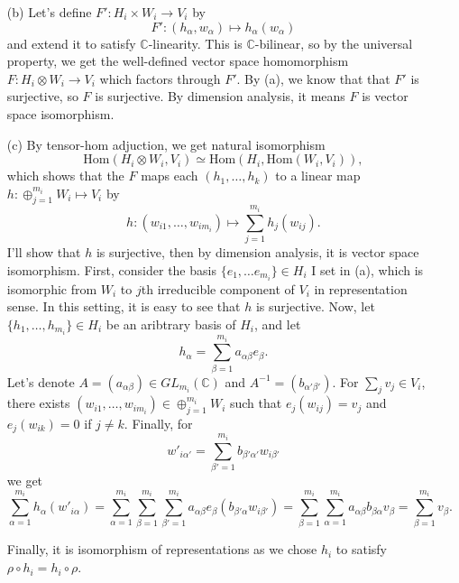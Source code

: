 \documentclass[a4paper, 12pt]{article}
\theoremstyle{Mydefinition}
\theoremstyle{Mytheorem}
\begin{document}
\begin{enumerate}
    \item[(b)] Let's define $F':H_i\times W_i\rightarrow V_i$ by
    \begin{equation}
        F':(h_\alpha, w_\alpha)\mapsto h_\alpha(w_\alpha)
    \end{equation}
    and extend it to satisfy $\mathbb{C}$-linearity. This is $\mathbb{C}$-bilinear, so by the universal property, we get the well-defined vector space homomorphism $F:H_i\otimes W_i\rightarrow V_i$ which factors through $F'$. By (a), we know that that $F'$ is surjective, so $F$ is surjective. By dimension analysis, it means $F$ is vector space isomorphism.
    
    \item[(c)] By tensor-hom adjuction, we get natural isomorphism
    \begin{equation}
        \mathrm{Hom}(H_i\otimes W_i, V_i)\simeq \mathrm{Hom}(H_i, \mathrm{Hom}(W_i, V_i)),
    \end{equation}
    which shows that the $F$ maps each $(h_1, \ldots, h_k)$ to a linear map $h:\oplus_{j=1}^{m_i}W_i\mapsto V_i$ by
    \begin{equation}
        h:(w_{i1}, \ldots, w_{im_i})\mapsto \sum_{j=1}^{m_i}h_j(w_{ij}).
    \end{equation}
    I'll show that $h$ is surjective, then by dimension analysis, it is vector space isomorphism. First, consider the basis $\{e_1, \ldots e_{m_i}\}\in H_i$ I set in (a), which is isomorphic from $W_i$ to $j$th irreducible component of $V_i$ in representation sense. In this setting, it is easy to see that $h$ is surjective. Now, let $\{h_1, \ldots, h_{m_i}\}\in H_i$ be an aribtrary basis of $H_i$, and let
    \begin{equation}
        h_\alpha = \sum_{\beta=1}^{m_i}a_{\alpha \beta}e_{\beta}.
    \end{equation}
    Let's denote $A = (a_{\alpha\beta})\in GL_{m_i}(\mathbb{C})$ and $A^{-1} = (b_{\alpha'\beta'})$. For $\sum_{j}v_{j}\in V_i$, there exists $(w_{i1}, \ldots, w_{im_i})\in \oplus_{j=1}^{m_i} W_i$ such that $e_j(w_{ij}) = v_j$ and $e_j(w_{ik})=0$ if $j\neq k$. Finally, for
    \begin{equation}
        w'_{i\alpha'} = \sum_{\beta'=1}^{m_i}b_{\beta'\alpha'}w_{i\beta'}
    \end{equation}
    we get
    \begin{equation}
        \sum_{\alpha=1}^{m_i} h_\alpha(w'_{i\alpha}) =\sum_{\alpha=1}^{m_i} \sum_{\beta=1}^{m_i}\sum_{\beta'=1}^{m_i}a_{\alpha \beta}e_\beta(b_{\beta'\alpha}w_{i\beta'}) = \sum_{\beta=1}^{m_i}\sum_{\alpha=1}^{m_i} a_{\alpha \beta}b_{\beta\alpha}v_{\beta} = \sum_{\beta=1}^{m_i} v_\beta.
    \end{equation}
    
    Finally, it is isomorphism of representations as we chose $h_i$ to satisfy $\rho\circ h_i = h_i\circ \rho$.
\end{enumerate}
\end{document}
